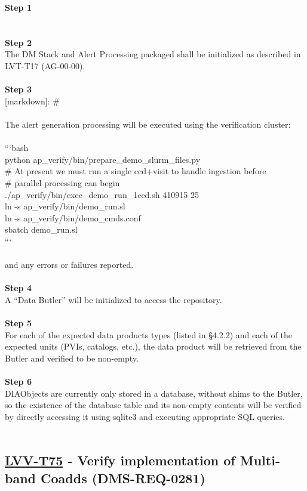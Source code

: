\textbf{Step 1}\\
~\\
~\\
\textbf{Step 2}\\
The DM Stack and Alert Processing packaged shall be initialized as
described in LVT-T17 (AG-00-00).\\
~\\
\textbf{Step 3}\\
{[}markdown{]}: \#\\
~\\
The alert generation processing will be executed using the verification
cluster:\\
~\\
```bash\\
python ap\_verify/bin/prepare\_demo\_slurm\_files.py\\
\# At present we must run a single ccd+visit to handle ingestion
before\\
\# parallel processing can begin\\
./ap\_verify/bin/exec\_demo\_run\_1ccd.sh 410915 25\\
ln -s ap\_verify/bin/demo\_run.sl\\
ln -s ap\_verify/bin/demo\_cmds.conf\\
sbatch demo\_run.sl\\
```\\
~\\
and any errors or failures reported.\\
~\\
\textbf{Step 4}\\
A ``Data Butler'' will be initialized to access the repository.\\
~\\
\textbf{Step 5}\\
For each of the expected data products types (listed in §4.2.2) and each
of the expected units (PVIs, catalogs, etc.), the data product will be
retrieved from the Butler and verified to be non-empty.\\
~\\
\textbf{Step 6}\\
DIAObjects are currently only stored in a database, without shims to the
Butler, so the existence of the database table and its non-empty
contents will be verified by directly accessing it using sqlite3 and
executing appropriate SQL queries.\\
~\\

\hypertarget{lvv-t75---verify-implementation-of-multi-band-coadds-dms-req-0281}{%
\subsection{\texorpdfstring{\href{https://jira.lsstcorp.org/secure/Tests.jspa\#/testCase/LVV-T75}{LVV-T75}
- Verify implementation of Multi-band Coadds
(DMS-REQ-0281)}{LVV-T75 - Verify implementation of Multi-band Coadds (DMS-REQ-0281)}}\label{lvv-t75---verify-implementation-of-multi-band-coadds-dms-req-0281}}

